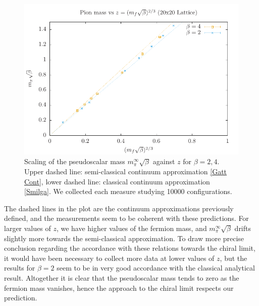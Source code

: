 \begin{figure}
    \centering
    \includegraphics{images/scaling.pdf}
    \caption{Scaling of the pseudoscalar mass $m_\pi^\infty \sqrt{\beta}$ against $z$ for $\beta = 2, 4$. Upper dashed line: semi-classical continuum approximation \eqref{Gatt Cont}, lower dashed line: classical continuum approximation \eqref{Smilga}. We collected each measure studying 10000 configurations.}
    \label{fig: scaling z}
\end{figure}
The dashed lines in the plot are the continuum approximations previously defined, and the measurements seem to be coherent with these predictions. For larger values of $z$, we have higher values of the fermion mass, and $m_\pi^\infty\sqrt{\beta}$ drifts slightly more towards the semi-classical approximation. To draw more precise conclusion regarding the accordance with these relations towards the chiral limit, it would have been necessary to collect more data at lower values of $z$, but the results for $\beta = 2$ seem to be in very good accordance with the classical analytical result.
Altogether it is clear that the pseudoscalar mass tends to zero as the fermion mass vanishes, hence the approach to the chiral limit respects our prediction.
\newpage
